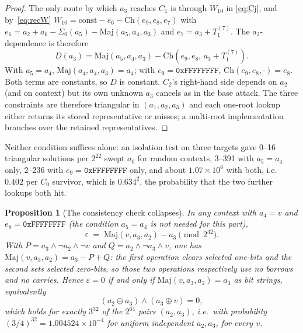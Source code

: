 \documentclass[11pt,a4paper]{article}
\newtheorem{proposition}{Proposition}
\newcommand{\Sig}[1]{\Sigma_{#1}}
\newcommand{\Maj}{\mathrm{Maj}}
\newcommand{\Ch}{\mathrm{Ch}}
\newcommand{\hex}[1]{\texttt{#1}}
\begin{document}
\begin{proof}
The only route by which $a_3$ reaches $C_1$ is through $W_{10}$ in
\eqref{eq:Cj}, and by~\eqref{eq:recW}
$W_{10}=\text{const}-e_6-\Ch(e_9,e_8,e_7)$ with
$e_6 = a_2 + a_6 - \Sig0(a_5) - \Maj(a_5,a_4,a_3)$ and $e_7=a_3+T_1^{(7)}$.
The $a_3$-dependence is therefore
\[
D(a_3) = \Maj(a_5,a_4,a_3) - \Ch(e_9,e_8,\,a_3+T_1^{(7)}) .
\]
With $a_5=a_4$, $\Maj(a_4,a_4,a_3)=a_4$; with $e_9=\hex{0xFFFFFFFF}$,
$\Ch(e_9,e_8,\cdot)=e_8$.  Both terms are constants, so $D$ is constant.
$C_2$'s right-hand side depends on $a_2$ (and on context) but its own unknown
$a_3$ cancels as in the base attack.  The three constraints are therefore
triangular in $(a_1,a_2,a_3)$ and each one-root lookup either returns its
stored representative or misses; a multi-root implementation branches over
the retained representatives.
\end{proof}

Neither condition suffices alone: an isolation test on three targets gave
0--16 triangular solutions per $2^{22}$ swept $a_0$ for random contexts, 3--391
with $a_5=a_4$ only, 2--236 with $e_9=\hex{0xFFFFFFFF}$ only, and about
$1.07\times10^6$ with both, i.e.\ $0.402$ per $C_0$ survivor, which is
$0.634^2$, the probability that the two further lookups both hit.

\begin{proposition}[The consistency check collapses]
\label{prop:collapse}
In any context with $a_4=v$ and $e_8=\hex{0xFFFFFFFF}$ (the condition
$a_5=a_4$ is not needed for this part),
\begin{equation}
\varepsilon \;=\; \Maj(v,a_3,a_2) - a_3 \pmod{2^{32}} .
\label{eq:collapse}
\end{equation}
With $P = a_3\wedge\neg a_2\wedge\neg v$ and
$Q=a_2\wedge\neg a_3\wedge v$, one has $\Maj(v,a_3,a_2)=a_3-P+Q$: the first
operation clears selected one-bits and the second sets selected zero-bits, so
those two operations respectively use no borrows and no carries.  Hence
$\varepsilon=0$ if and only
if $\Maj(v,a_3,a_2)=a_3$ as bit strings, equivalently
\begin{equation}
(a_2\oplus a_3)\wedge(a_3\oplus v) = 0,
\label{eq:compact}
\end{equation}
which holds for exactly $3^{32}$ of the $2^{64}$ pairs $(a_2,a_3)$, i.e.\
with probability $(3/4)^{32}=1.004524\times10^{-4}$ for uniform independent
$a_2,a_3$, for every $v$.
\end{proposition}
\end{document}
